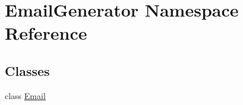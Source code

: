 \hypertarget{namespace_email_generator}{}\section{Email\+Generator Namespace Reference}
\label{namespace_email_generator}
\subsection*{Classes}
\begin{DoxyCompactItemize}
\item 
class \mbox{\hyperlink{class_email_generator_1_1_email}{Email}}
\end{DoxyCompactItemize}
